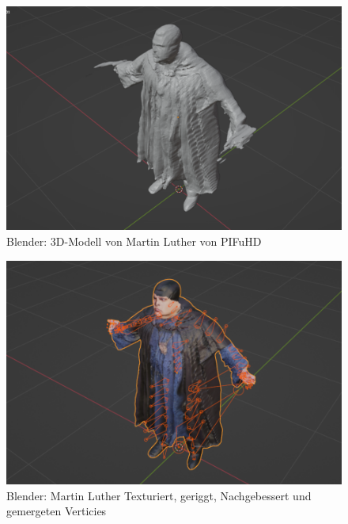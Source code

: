 \documentclass[10pt,a4paper,bibliography=totocnumbered,listof=totocnumbered]{scrartcl}
\begin{document}
\begin{figure}
	 \centering
	\includegraphics[width=14cm]{BilderFuerBA/Screenshot/BlenderMLVonPIFuHD105k.png}
	\caption{Blender: 3D-Modell von Martin Luther von PIFuHD}
	\label{BlenderMLVonPIFuHD105k}
\end{figure}
\begin{figure}
	 \centering
	\includegraphics[width=14cm]{BilderFuerBA/Screenshot/BlenderMLGeriggtUndTexturiert95k.png}
	\caption{Blender: Martin Luther Texturiert, geriggt, Nachgebessert und gemergeten Verticies}
	\label{BlenderMLVonPIFuHD105k}
\end{figure}
\end{document}
